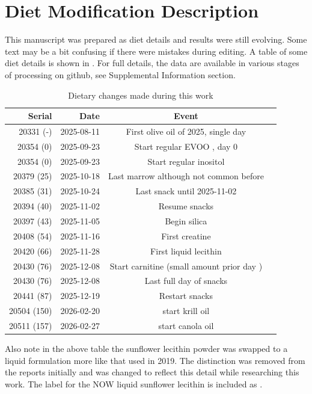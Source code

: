 % 



\section{ Diet Modification Description }

This  manuscript was prepared as diet details and 
results were still evolving. Some
text may be a bit confusing if there were mistakes during editing.
A table of some diet details is shown in .
For full details, the data are available in various stages
of processing on github, see Supplemental Information section.


\begin{table}[H] \centering
\begin{tabular}{|r|r|c|r|}
\hline
Serial & Date & Event  &  \\
\hline
20331 (-) & 2025-08-11 & First olive oil of 2025, single day    &  \\
20354 (0)  & 2025-09-23 & Start regular EVOO , day 0    &  \\
20354 (0)  & 2025-09-23 & Start regular inositol     &  \\
20379 (25)  & 2025-10-18 & Last marrow although not common before    &  \\
20385 (31)  & 2025-10-24 & Last snack until 2025-11-02    &  \\
20394 (40)  & 2025-11-02 & Resume snacks     &  \\
20397 (43)  & 2025-11-05 & Begin silica     &  \\
20408 (54)  & 2025-11-16 & First creatine    &  \\
20420 (66)  & 2025-11-28 & First liquid lecithin    &  \\
20430 (76)  & 2025-12-08 & Start carnitine (small amount prior day ) &  \\
20430 (76)  & 2025-12-08 & Last full day of snacks      &  \\
20441 (87)  & 2025-12-19 & Restart  snacks      &  \\
20504 (150) & 2026-02-20 & start krill oil      &  \\
20511 (157) & 2026-02-27 & start canola oil      &  \\
\hline
\end{tabular}
\caption{ Dietary changes made during this work }
\label{tab:details}
\end{table}

Also note in the above table  the sunflower lecithin powder was   swapped
to a liquid formulation more like that used in 2019. The 
distinction was removed from the reports initially and was
changed to reflect this detail  while researching this work. 
The label for the NOW liquid sunflower lecithin
is included as .

